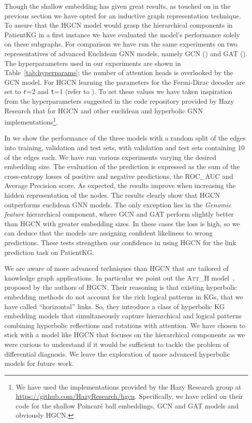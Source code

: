 Though the shallow embedding has given great results, as touched on in the previous section we have opted for an inductive graph representation technique. To assure that the HGCN model would grasp the hierarchical components in PatientKG in a first instance we have evaluated the model's performance solely on these subgraphs. For comparison we have run the same experiments on two representatives of advanced Euclidean GNN models, namely GCN () and GAT (). The hyperparameters used in our experiments are shown in Table~\ref{tab:hyperparams}; the number of attention heads is overlooked by the GCN model. For HGCN learning the parameters for the Fermi-Dirac decoder are set to \texttt{r}=2 and \texttt{t}=1 (refer to ). To set these values we have taken inspiration from the hyperparameters suggested in the code repository provided by Hazy Research that for HGCN and other euclidean and hyperbolic GNN implementations\footnote{We have used the implementations provided by the Hazy Research group at \url{https://github.com/HazyResearch/hgcn}. Specifically, we have relied on their code for the shallow Poincaré ball embeddings, GCN and GAT models and obviously HGCN.}. 


In  we show the performance of the three models with a random split of the edges into training, validation and test sets, with validation and test sets containing 10 of the edges each. We have run various experiments varying the desired embedding size. The evaluation of the prediction is expressed as the sum of the cross-entropy losses of positive and negative predictions, the ROC\_AUC and Average Precision score. As expected, the results improve when increasing the hidden representation of the nodes. The results clearly show that HGCN outperforms euclidean GNN models. The only exception lies in the \emph{Genomic feature} hierarchical component, where GCN and GAT perform slightly better than HGCN with greater embedding sizes. In these cases the loss is high, so we can deduce that the models are assigning confident likeliness to wrong predictions. These tests strengthen our confidence in using HGCN for the link prediction task on PatientKG.


We are aware of more advanced techniques than HGCN that are tailored of knowledge graph applications. In particular we point out the \textsc{Att\_H} model~\cite{chami2020lowDimensionalHyperbolicKnowledgeGraphEmbeddings}, proposed by the authors of HGCN. Their reasoning is that existing hyperbolic embedding methods do not account for the rich logical patterns in KGs, that we have called ``horizontal'' links. So, they introduce a class of hyperbolic KG embedding models that simultaneously capture hierarchical and logical patterns combining hyperbolic reflections and rotations with attention. We have chosen to stick with a model like HGCN that focuses on the hierarchical components as we were curious to understand if it would be sufficient to tackle the problem of differential diagnosis. We leave the exploration of more advanced hyperbolic models for future work.